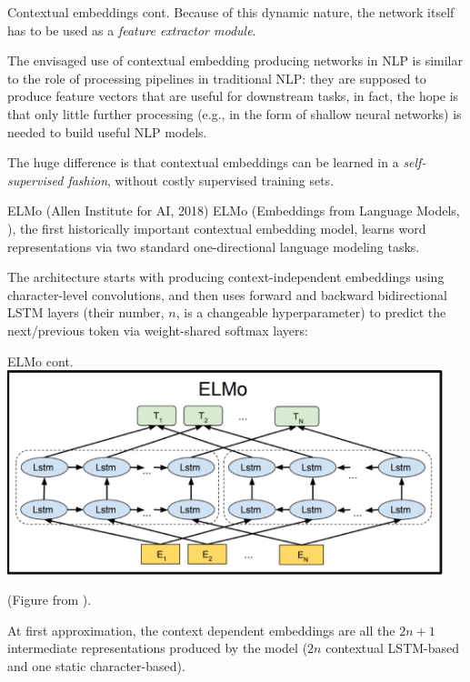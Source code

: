 \documentclass[style=upen, size=14pt]{powerdot}
\newcommand{\gold}{\color{arany}}
\theoremstyle{definition}
\begin{document}
\begin{slide}[toc=]{Contextual embeddings cont.}
  Because of this dynamic nature, the network itself has to be used as a
  \emph{\gold feature extractor module}.\bigskip

  The envisaged use of contextual embedding producing networks in NLP is similar
  to the role of processing pipelines in traditional NLP: they are supposed to
  produce feature vectors that are useful for downstream tasks, in fact, the
  hope is that only little further processing (e.g., in the form of shallow
  neural networks) is needed to build useful NLP models.\bigskip

  The huge difference is that contextual embeddings can be learned in a
  \emph{\gold self-supervised fashion}, without costly supervised training sets.
\end{slide}

\begin{slide}[toc=ELMo]{ELMo (Allen Institute for AI, 2018)}
  ELMo (Embeddings from Language Models, \cite{peters2018deep}), the
  first historically important contextual embedding model, learns word
  representations via two standard one-directional language modeling
  tasks.\bigskip

  The architecture starts with producing context-independent embeddings using
  character-level convolutions, and then uses forward and backward bidirectional
  LSTM layers (their number, $n$, is a changeable hyperparameter) to predict the
  next/previous token via weight-shared softmax layers:
\end{slide}

\begin{slide}[toc=]{ELMo cont.}
  \hspace{0.3cm}\includegraphics[width=0.95\textwidth]{figures/elmo.eps}

  \footnotesize{\hspace{3.3cm}(Figure from \cite{peters2018deep}).}
  
  \normalsize At first approximation, the context dependent embeddings are all
  the $2n +1 $ intermediate representations produced by the model ($2n$
  contextual LSTM-based and one static character-based).
\end{slide}
\end{document}
